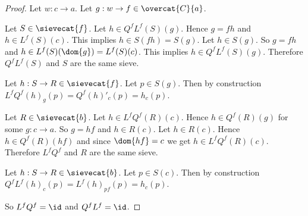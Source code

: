\begin{proof}
Let $w: c \rightarrow a$.
Let $g:w \rightarrow f \in \overcat{C}{a}$.

Let $S\in \sievecat{f}$.
Let $h\in Q^fL^f(S)(g)$.
Hence $g=fh$ and $h\in L^f(S)(c)$.
This implies $h\in S(fh) = S(g)$.
Let $h\in S(g)$.
So $g=fh$ and $h \in L^f(S)(\dom{g})= L^f(S)(c)$.
This implies $h\in Q^fL^f(S)(g)$.
Therefore $Q^fL^f(S)$ and $S$ are the same sieve.

Let $h:S \rightarrow R \in \sievecat{f}$.
Let $p \in S(g)$.
Then by construction $L^fQ^f(h)_g(p) = Q^f(h)'_{c}(p) = h_{c}(p)$.

Let $R\in \sievecat{b}$.
Let $h\in L^fQ^f(R)(c)$.
Hence $h\in Q^f(R)(g)$ for some $g:c\rightarrow a$.
So $g=hf$ and $h\in R(c)$.
Let $h\in R(c)$.
Hence $h\in Q^f(R)(hf)$ and since $\dom{hf} = c$ we get $h\in L^fQ^f(R)(c)$.
Therefore $L^fQ^f$ and $R$ are the same sieve.

Let $h:S \rightarrow R \in \sievecat{b}$.
Let $p \in S(c)$.
Then by construction $Q^fL^f(h)_{c}(p) = L^f(h)_{pf}(p) = h_{c}(p)$.

So $L^fQ^f = \id$ and $Q^fL^f = \id$.
\end{proof}